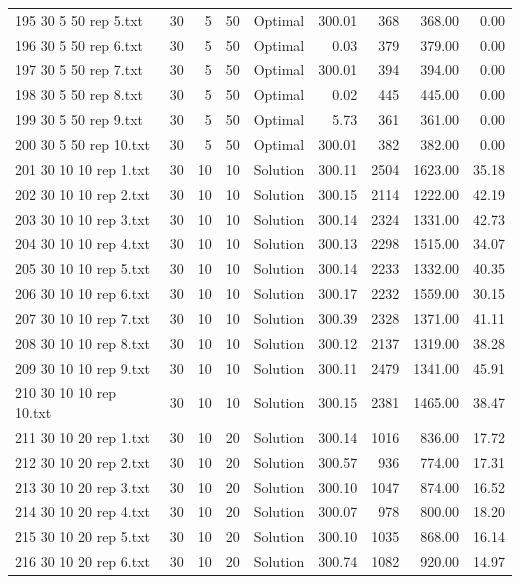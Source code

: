 \begin{longtable}{lrrllrrrr}
195 30 5 50 rep 5.txt & 30 & 5 & 50 & Optimal & 300.01 & 368 & 368.00 &  0.00\\
196 30 5 50 rep 6.txt & 30 & 5 & 50 & Optimal &  0.03 & 379 & 379.00 &  0.00\\
197 30 5 50 rep 7.txt & 30 & 5 & 50 & Optimal & 300.01 & 394 & 394.00 &  0.00\\
198 30 5 50 rep 8.txt & 30 & 5 & 50 & Optimal &  0.02 & 445 & 445.00 &  0.00\\
199 30 5 50 rep 9.txt & 30 & 5 & 50 & Optimal &  5.73 & 361 & 361.00 &  0.00\\
200 30 5 50 rep 10.txt & 30 & 5 & 50 & Optimal & 300.01 & 382 & 382.00 &  0.00\\
201 30 10 10 rep 1.txt & 30 & 10 & 10 & Solution & 300.11 & 2504 & 1623.00 & 35.18\\
202 30 10 10 rep 2.txt & 30 & 10 & 10 & Solution & 300.15 & 2114 & 1222.00 & 42.19\\
203 30 10 10 rep 3.txt & 30 & 10 & 10 & Solution & 300.14 & 2324 & 1331.00 & 42.73\\
204 30 10 10 rep 4.txt & 30 & 10 & 10 & Solution & 300.13 & 2298 & 1515.00 & 34.07\\
205 30 10 10 rep 5.txt & 30 & 10 & 10 & Solution & 300.14 & 2233 & 1332.00 & 40.35\\
206 30 10 10 rep 6.txt & 30 & 10 & 10 & Solution & 300.17 & 2232 & 1559.00 & 30.15\\
207 30 10 10 rep 7.txt & 30 & 10 & 10 & Solution & 300.39 & 2328 & 1371.00 & 41.11\\
208 30 10 10 rep 8.txt & 30 & 10 & 10 & Solution & 300.12 & 2137 & 1319.00 & 38.28\\
209 30 10 10 rep 9.txt & 30 & 10 & 10 & Solution & 300.11 & 2479 & 1341.00 & 45.91\\
210 30 10 10 rep 10.txt & 30 & 10 & 10 & Solution & 300.15 & 2381 & 1465.00 & 38.47\\
211 30 10 20 rep 1.txt & 30 & 10 & 20 & Solution & 300.14 & 1016 & 836.00 & 17.72\\
212 30 10 20 rep 2.txt & 30 & 10 & 20 & Solution & 300.57 & 936 & 774.00 & 17.31\\
213 30 10 20 rep 3.txt & 30 & 10 & 20 & Solution & 300.10 & 1047 & 874.00 & 16.52\\
214 30 10 20 rep 4.txt & 30 & 10 & 20 & Solution & 300.07 & 978 & 800.00 & 18.20\\
215 30 10 20 rep 5.txt & 30 & 10 & 20 & Solution & 300.10 & 1035 & 868.00 & 16.14\\
216 30 10 20 rep 6.txt & 30 & 10 & 20 & Solution & 300.74 & 1082 & 920.00 & 14.97\\

\end{longtable}
